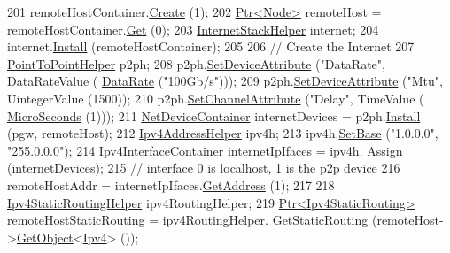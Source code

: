 \begin{DoxyCode}
201         remoteHostContainer.\hyperlink{classns3_1_1NodeContainer_a787f059e2813e8b951cc6914d11dfe69}{Create} (1);
202         \hyperlink{classns3_1_1Ptr}{Ptr<Node>} remoteHost = remoteHostContainer.\hyperlink{classns3_1_1NodeContainer_a9ed96e2ecc22e0f5a3d4842eb9bf90bf}{Get} (0);
203         \hyperlink{classns3_1_1InternetStackHelper}{InternetStackHelper} internet;
204         internet.\hyperlink{classns3_1_1InternetStackHelper_a6645b412f31283d2d9bc3d8a95cebbc0}{Install} (remoteHostContainer);
205 
206         \textcolor{comment}{// Create the Internet}
207         \hyperlink{classns3_1_1PointToPointHelper}{PointToPointHelper} p2ph;
208         p2ph.\hyperlink{classns3_1_1PointToPointHelper_a4577f5ab8c387e5528af2e0fbab1152e}{SetDeviceAttribute} (\textcolor{stringliteral}{"DataRate"}, DataRateValue (
      \hyperlink{classns3_1_1DataRate}{DataRate} (\textcolor{stringliteral}{"100Gb/s"})));
209         p2ph.\hyperlink{classns3_1_1PointToPointHelper_a4577f5ab8c387e5528af2e0fbab1152e}{SetDeviceAttribute} (\textcolor{stringliteral}{"Mtu"}, UintegerValue (1500));
210         p2ph.\hyperlink{classns3_1_1PointToPointHelper_a6b5317fd17fb61e5a53f8d66a90b63b9}{SetChannelAttribute} (\textcolor{stringliteral}{"Delay"}, TimeValue (
      \hyperlink{group__timecivil_ga17465a639c8d1464e76538afdd78a9f0}{MicroSeconds} (1)));
211         \hyperlink{classns3_1_1NetDeviceContainer}{NetDeviceContainer} internetDevices = p2ph.\hyperlink{classns3_1_1PointToPointHelper_ab9162fea3e88722666fed1106df1f9ec}{Install} (pgw, remoteHost);
212         \hyperlink{classns3_1_1Ipv4AddressHelper}{Ipv4AddressHelper} ipv4h;
213         ipv4h.\hyperlink{classns3_1_1Ipv4AddressHelper_acf7b16dd25bac67e00f5e25f90a9a035}{SetBase} (\textcolor{stringliteral}{"1.0.0.0"}, \textcolor{stringliteral}{"255.0.0.0"});
214         \hyperlink{classns3_1_1Ipv4InterfaceContainer}{Ipv4InterfaceContainer} internetIpIfaces = ipv4h.
      \hyperlink{classns3_1_1Ipv4AddressHelper_af8e7f4a1a7e74c00014a1eac445a27af}{Assign} (internetDevices);
215         \textcolor{comment}{// interface 0 is localhost, 1 is the p2p device}
216         remoteHostAddr = internetIpIfaces.\hyperlink{classns3_1_1Ipv4InterfaceContainer_ae63208dcd222be986822937ee4aa828c}{GetAddress} (1);
217 
218         \hyperlink{classns3_1_1Ipv4StaticRoutingHelper}{Ipv4StaticRoutingHelper} ipv4RoutingHelper;
219         \hyperlink{classns3_1_1Ptr}{Ptr<Ipv4StaticRouting>} remoteHostStaticRouting = ipv4RoutingHelper.
      \hyperlink{classns3_1_1Ipv4StaticRoutingHelper_a731206e50d305695dac7fb2ef963a4bb}{GetStaticRouting} (remoteHost->\hyperlink{classns3_1_1Object_a13e18c00017096c8381eb651d5bd0783}{GetObject}<\hyperlink{classns3_1_1Ipv4}{Ipv4}> ());

\end{DoxyCode}
